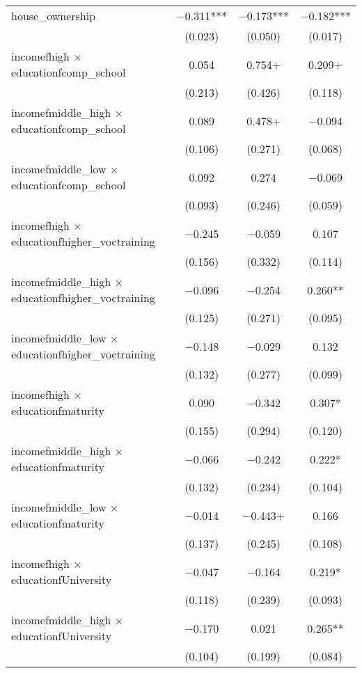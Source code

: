\begin{table}
\begin{tabular}[t]{lccc}
house\_ownership & \num{-0.311}*** & \num{-0.173}*** & \num{-0.182}***\\
 & (\num{0.023}) & (\num{0.050}) & (\num{0.017})\\
incomefhigh × educationfcomp\_school & \num{0.054} & \num{0.754}+ & \num{0.209}+\\
 & (\num{0.213}) & (\num{0.426}) & (\num{0.118})\\
incomefmiddle\_high × educationfcomp\_school & \num{0.089} & \num{0.478}+ & \num{-0.094}\\
 & (\num{0.106}) & (\num{0.271}) & (\num{0.068})\\
incomefmiddle\_low × educationfcomp\_school & \num{0.092} & \num{0.274} & \num{-0.069}\\
 & (\num{0.093}) & (\num{0.246}) & (\num{0.059})\\
incomefhigh × educationfhigher\_voctraining & \num{-0.245} & \num{-0.059} & \num{0.107}\\
 & (\num{0.156}) & (\num{0.332}) & (\num{0.114})\\
incomefmiddle\_high × educationfhigher\_voctraining & \num{-0.096} & \num{-0.254} & \num{0.260}**\\
 & (\num{0.125}) & (\num{0.271}) & (\num{0.095})\\
incomefmiddle\_low × educationfhigher\_voctraining & \num{-0.148} & \num{-0.029} & \num{0.132}\\
 & (\num{0.132}) & (\num{0.277}) & (\num{0.099})\\
incomefhigh × educationfmaturity & \num{0.090} & \num{-0.342} & \num{0.307}*\\
 & (\num{0.155}) & (\num{0.294}) & (\num{0.120})\\
incomefmiddle\_high × educationfmaturity & \num{-0.066} & \num{-0.242} & \num{0.222}*\\
 & (\num{0.132}) & (\num{0.234}) & (\num{0.104})\\
incomefmiddle\_low × educationfmaturity & \num{-0.014} & \num{-0.443}+ & \num{0.166}\\
 & (\num{0.137}) & (\num{0.245}) & (\num{0.108})\\
incomefhigh × educationfUniversity & \num{-0.047} & \num{-0.164} & \num{0.219}*\\
 & (\num{0.118}) & (\num{0.239}) & (\num{0.093})\\
incomefmiddle\_high × educationfUniversity & \num{-0.170} & \num{0.021} & \num{0.265}**\\
 & (\num{0.104}) & (\num{0.199}) & (\num{0.084})\\

\end{tabular}
\end{table}
